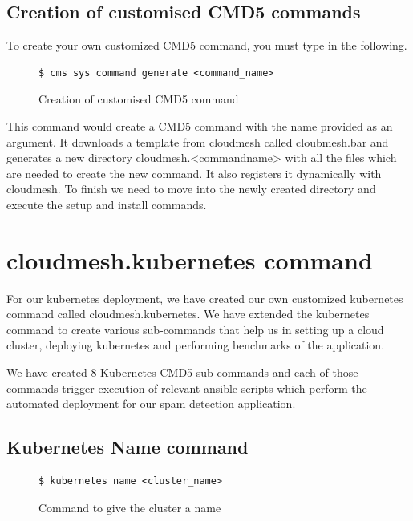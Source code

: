 \documentclass[9pt,twocolumn,twoside]{../../styles/osajnl}
\begin{document}
{\subsection{Creation of customised CMD5 commands}
To create your own customized CMD5 command, you must type in the
following.

\begin{figure}[H]
\begin{verbatim}
$ cms sys command generate <command_name>
\end{verbatim}
\caption{Creation of customised CMD5 command}
\label{Creation of customised CMD5 command}
\end{figure}


\noindent
This command would create a CMD5 command with the name provided as an
argument. It downloads a template from cloudmesh called cloubmesh.bar
and generates a new directory cloudmesh.<command\textunderscore name>
with all the files which are needed to create the new command. It also
registers it dynamically with cloudmesh. To finish we need to move
into the newly created directory and execute the setup and install
commands.

\section{cloudmesh.kubernetes command}
For our kubernetes deployment, we have
created our own customized kubernetes command called
cloudmesh.kubernetes. We have extended the kubernetes command to
create various sub-commands that help us in setting up a cloud cluster,
deploying kubernetes and performing benchmarks of the application.

\noindent
We have created 8 Kubernetes CMD5 sub-commands and each of those
commands trigger execution of relevant ansible scripts which perform
the automated deployment for our spam detection application.\newline

\subsection{Kubernetes Name command}
\begin{figure}[H]
\begin{verbatim}
$ kubernetes name <cluster_name>
\end{verbatim}
\caption{Command to give the cluster a name}
\vspace{-4mm}
\label{Command to given the cluster a name}
\end{figure}

}
\end{document}
